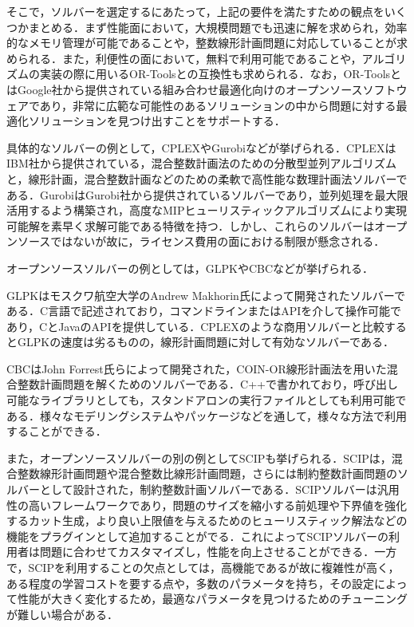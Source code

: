           \par そこで，ソルバーを選定するにあたって，上記の要件を満たすための観点をいくつかまとめる．まず性能面において，大規模問題でも迅速に解を求められ，効率的なメモリ管理が可能であることや，整数線形計画問題に対応していることが求められる．また，利便性の面において，無料で利用可能であることや，アルゴリズムの実装の際に用いるOR-Toolsとの互換性も求められる．なお，OR-ToolsとはGoogle社から提供されている組み合わせ最適化向けのオープンソースソフトウェアであり，非常に広範な可能性のあるソリューションの中から問題に対する最適化ソリューションを見つけ出すことをサポートする．
          
          \par 具体的なソルバーの例として，CPLEXやGurobiなどが挙げられる．CPLEXはIBM社から提供されている，混合整数計画法のための分散型並列アルゴリズムと，線形計画，混合整数計画などのための柔軟で高性能な数理計画法ソルバーである．GurobiはGurobi社から提供されているソルバーであり，並列処理を最大限活用するよう構築され，高度なMIPヒューリスティックアルゴリズムにより実現可能解を素早く求解可能である特徴を持つ．しかし、これらのソルバーはオープンソースではないが故に，ライセンス費用の面における制限が懸念される．
          
          \par オープンソースソルバーの例としては，GLPKやCBCなどが挙げられる．
          
          \par GLPKはモスクワ航空大学のAndrew Makhorin氏によって開発されたソルバーである．C言語で記述されており，コマンドラインまたはAPIを介して操作可能であり，CとJavaのAPIを提供している．CPLEXのような商用ソルバーと比較するとGLPKの速度は劣るものの，線形計画問題に対して有効なソルバーである．
          
          \par CBCはJohn Forrest氏らによって開発された，COIN-OR線形計画法を用いた混合整数計画問題を解くためのソルバーである．C++で書かれており，呼び出し可能なライブラリとしても，スタンドアロンの実行ファイルとしても利用可能である．様々なモデリングシステムやパッケージなどを通して，様々な方法で利用することができる．
          
          \par また，オープンソースソルバーの別の例としてSCIPも挙げられる．SCIPは，混合整数線形計画問題や混合整数比線形計画問題，さらには制約整数計画問題のソルバーとして設計された，制約整数計画ソルバーである．SCIPソルバーは汎用性の高いフレームワークであり，問題のサイズを縮小する前処理や下界値を強化するカット生成，より良い上限値を与えるためのヒューリスティック解法などの機能をプラグインとして追加することがでる．これによってSCIPソルバーの利用者は問題に合わせてカスタマイズし，性能を向上させることができる．一方で，SCIPを利用することの欠点としては，高機能であるが故に複雑性が高く，ある程度の学習コストを要する点や，多数のパラメータを持ち，その設定によって性能が大きく変化するため，最適なパラメータを見つけるためのチューニングが難しい場合がある．
          

